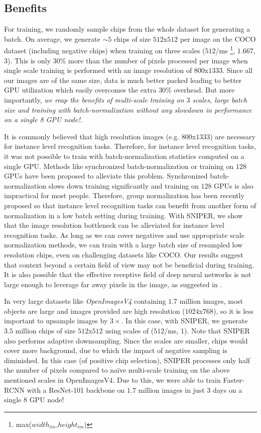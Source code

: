 \documentclass{article}
\begin{document}
\subsection{Benefits}
For training, we randomly sample chips from the whole dataset for generating a batch. On average, we generate $\sim 5$ chips of size $512$x$512$ per image on the COCO dataset (including negative chips) when training on three scales ($512$/ms \footnote{max($width_{im}$,$height_{im}$)}, $1.667$, $3$). This is only $30$\% more than the number of pixels processed per image when single scale training is performed with an image resolution of $800$x$1333$. Since all our images are of the same size, data is much better packed leading to better GPU utilization which easily overcomes the extra $30$\% overhead. But more importantly, {\em we reap the benefits of multi-scale training on $3$ scales, large batch size and training with batch-normalization without any slowdown in performance on a single 8 GPU node!}.


It is commonly believed that high resolution images (e.g. $800$x$1333$) are necessary for instance level recognition tasks. Therefore, for instance level recognition tasks, it was not possible to train with batch-normalization statistics computed on a single GPU. Methods like synchronized batch-normalization \cite{liu2018path,zhao2017pyramid} or training on $128$ GPUs \cite{peng2017megdet} have been proposed to alleviate this problem. Synchronized batch-normalization slows down training significantly and training on $128$ GPUs is also impractical for most people. Therefore, group normalization \cite{GroupNorm2018} has been recently proposed so that instance level recognition tasks can benefit from another form of normalization in a low batch setting during training. With SNIPER, we show that the image resolution bottleneck can be alleviated for instance level recognition tasks. As long as we can cover negatives and use appropriate scale normalization methods, we can train with a large batch size of resampled low resolution chips, even on challenging datasets like COCO. Our results suggest that context beyond a certain field of view may not be beneficial during training. It is also possible that the effective receptive field of deep neural networks is not large enough to leverage far away pixels in the image, as suggested in \cite{luo2016understanding}.

In very large datasets like \textit{OpenImagesV4} \cite{openimages} containing $1.7$ million images, most objects are large and images provided are high resolution ($1024$x$768$), so it is less important to upsample images by $3\times$. In this case, with SNIPER, we generate $3.5$ million chips of size $512$x$512$ using scales of ($512$/ms, 1). Note that SNIPER also performs adaptive downsampling. Since the scales are smaller, chips would cover more background, due to which the impact of negative sampling is diminished. In this case (of positive chip selection), SNIPER processes only half the number of pixels compared to na\"ive multi-scale training on the above mentioned scales in OpenImagesV4. Due to this, we were able to train Faster-RCNN with a ResNet-101 backbone on $1.7$ million images in just $3$ days on a single $8$ GPU node!
\end{document}
